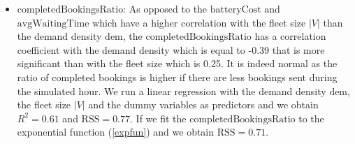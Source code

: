 \documentclass[12pt,a4paper]{article}
\begin{document}
\begin{itemize}
\item $\text{completedBookingsRatio}$: As opposed to the $\text{batteryCost}$ and $\text{avgWaitingTime}$ which have a higher correlation with the fleet size $|V|$ than the demand density $\text{dem}$, the $\text{completedBookingsRatio}$ has a correlation coefficient with the demand density which is equal to -0.39 that is more significant than with the fleet size which is 0.25. It is indeed normal as the ratio of completed bookings is higher if there are less bookings sent during the simulated hour. We run a linear regression with the demand density $\text{dem}$, the fleet size $|V|$ and the dummy variables as predictors and we obtain $R^{2} = 0.61$ and $\text{RSS} = 0.77$. If we fit the $\text{completedBookingsRatio}$ to the exponential function (\ref{expfun}) and we obtain $\text{RSS} = 0.71$.

\end{itemize}
\end{document}
